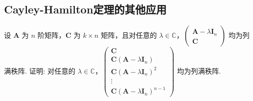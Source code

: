 \documentclass[../../main.tex]{subfiles}
\begin{document}
\subsection{Cayley-Hamilton定理的其他应用}

\begin{example}
设 $\boldsymbol{A}$ 为 $n$ 阶矩阵，$\boldsymbol{C}$ 为 $k\times n$ 矩阵，且对任意的 $\lambda\in\mathbb{C}$，$\begin{pmatrix}
\boldsymbol{A}-\lambda\boldsymbol{I}_n \\
\boldsymbol{C}
\end{pmatrix}$ 均为列满秩阵. 证明: 对任意的 $\lambda\in\mathbb{C}$，$\begin{pmatrix}
\boldsymbol{C} \\
\boldsymbol{C}(\boldsymbol{A}-\lambda\boldsymbol{I}_n) \\
\boldsymbol{C}(\boldsymbol{A}-\lambda\boldsymbol{I}_n)^2 \\
\vdots \\
\boldsymbol{C}(\boldsymbol{A}-\lambda\boldsymbol{I}_n)^{n - 1}
\end{pmatrix}$ 均为列满秩阵.
\end{example}
\end{document}
